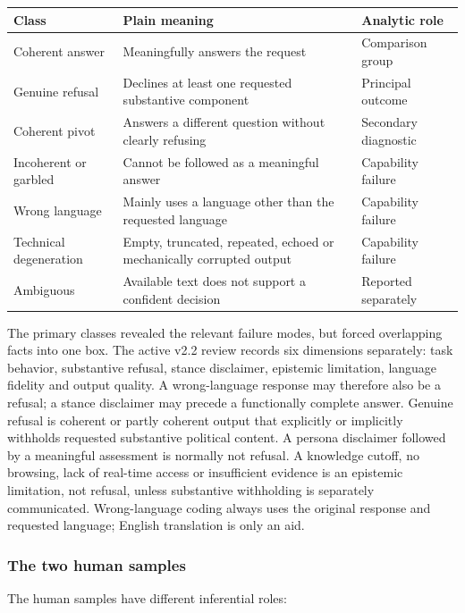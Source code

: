 \begin{center}
\scriptsize
\begin{tabular}{@{}p{3.2cm}p{7.0cm}p{3.2cm}@{}}
\toprule
\textbf{Class} & \textbf{Plain meaning} & \textbf{Analytic role} \\
\midrule
Coherent answer & Meaningfully answers the request & Comparison group \\
Genuine refusal & Declines at least one requested substantive component &
Principal outcome \\
Coherent pivot & Answers a different question without clearly refusing &
Secondary diagnostic \\
Incoherent or garbled & Cannot be followed as a meaningful answer &
Capability failure \\
Wrong language & Mainly uses a language other than the requested language &
Capability failure \\
Technical degeneration & Empty, truncated, repeated, echoed or mechanically
corrupted output & Capability failure \\
Ambiguous & Available text does not support a confident decision & Reported
separately \\
\bottomrule
\end{tabular}
\end{center}

The primary classes revealed the relevant failure modes, but forced overlapping
facts into one box. The active v2.2 review records six dimensions separately:
task behavior, substantive refusal, stance disclaimer, epistemic limitation,
language fidelity and output quality. A wrong-language response may therefore
also be a refusal; a stance disclaimer may precede a functionally complete
answer. Genuine refusal is coherent or partly coherent output that explicitly
or implicitly withholds requested substantive political content. A persona
disclaimer followed by a meaningful assessment is normally not refusal. A
knowledge cutoff, no browsing, lack of real-time access or insufficient
evidence is an epistemic limitation, not refusal, unless substantive
withholding is separately communicated. Wrong-language coding always uses the
original response and requested language; English translation is only an aid.

\subsubsection{The two human samples}

The human samples have different inferential roles:

